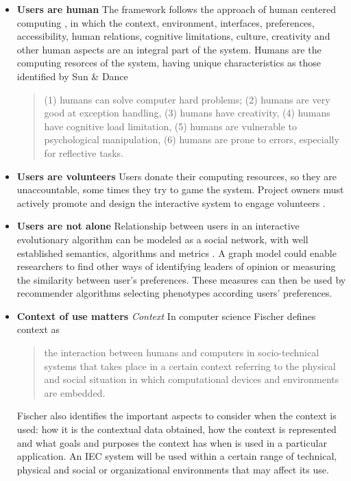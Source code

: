 \begin{itemize}
\item {\bf Users are human} 
  The framework follows the approach of human centered computing \cite{sebe2010human},
  in which the context, environment, interfaces, preferences, accessibility, human relations,
  cognitive limitations, culture, creativity and other human aspects are an integral part 
  of the system. Humans are the computing resorces of the system, having unique characteristics
  as those identified by Sun \& Dance \cite{Sun2013}
\begin{quote}
  (1) humans can solve computer hard problems; (2) humans are very good at exception handling,
  (3) humans have creativity, (4) humans have cognitive load limitation, (5) humans are
  vulnerable to psychological manipulation, (6) humans are prone to errors,
  especially for reflective tasks.
\end{quote}  


\item {\bf Users are volunteers} Users donate their computing resources, so they are 
unaccountable, some times they try to game the system. Project owners must actively promote and
design the interactive system to engage volunteers \cite{oh2015clicking}. %
\item {\bf Users are not alone}
  Relationship between users in an interactive evolutionary algorithm can be modeled
  as a social network, with well established semantics, algorithms and metrics 
  \cite{ahuja1993network}.
  A graph model could enable researchers to find other ways of identifying leaders of 
  opinion or measuring the similarity between user's preferences. 
  These measures can then be used by recommender algorithms selecting 
  phenotypes according users' preferences. 

\item {\bf Context of use matters}
  \textit{Context} In computer science Fischer \cite{fischer2012context}
  defines context as
  \begin{quote}
  the interaction between humans and
  computers in socio-technical systems that takes place in a certain
  context referring to the physical and social situation in which
  computational devices and environments are embedded.
\end{quote}   
  Fischer also identifies the important aspects to consider when the context is used: how it is
  the contextual data obtained, how the context is represented and what
  goals and purposes the context has when is used in a particular
  application.   An IEC system will  be used within a certain range 
  of technical, physical and social or
  organizational environments \cite{maguire2001context} that may affect its use.
 

\end{itemize}
